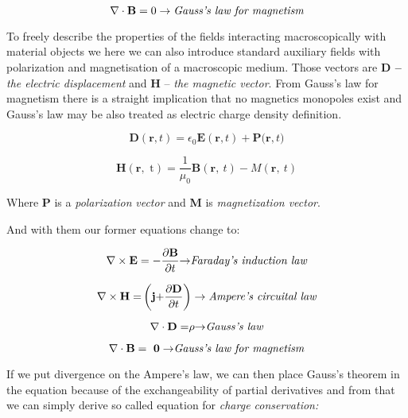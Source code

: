 \begin{equation}
\nabla \cdot \mathbf{B} =  0 \rightarrow \emph{Gauss's law for
magnetism}
\end{equation}

To freely describe the properties of the fields interacting
macroscopically with material objects we here we can also introduce
standard auxiliary fields with polarization and magnetisation of a
macroscopic medium. Those vectors are \textbf{D --} \emph{the electric
displacement} and \textbf{H} -- \emph{the magnetic vector}. From Gauss's
law for magnetism there is a straight implication that no magnetics
monopoles exist and Gauss's law may be also treated as electric charge
density definition.

\begin{equation}
\mathbf{D}\left( \mathbf{r,}t \right) = \epsilon_{0}\mathbf{E}\left( \mathbf{r,}t \right) + \mathbf{P(r,}t)
\end{equation}

\begin{equation}
\mathbf{H}\left( \mathbf{r,}\text{\ t} \right) = \frac{1}{\mu_{0}}\mathbf{B}\left( \mathbf{r,\ }t \right) - M(\mathbf{r,\ }t)
\end{equation}

Where \textbf{P} is a \emph{polarization} \emph{vector} and \textbf{M}
is \emph{magnetization vector}.

And with them our former equations change to:

\begin{equation}
\nabla \times \mathbf{E} = -\frac{\partial\mathbf{B}}{\partial t}\mathbf{\rightarrow}
\emph{Faraday's induction law}
\end{equation}

\begin{equation}
\nabla \times \mathbf{H =}\left( \mathbf{j +}\frac{\partial\mathbf{D}}{\partial t} \right) \rightarrow
\emph{Ampere's circuital law}
\end{equation}

\begin{equation}
\nabla \cdot \mathbf{D =}\rho\mathbf{\rightarrow} \emph{Gauss's
law}
\end{equation}

\begin{equation}
\nabla \cdot \mathbf{B = \ 0 \rightarrow} \emph{Gauss's law for
magnetism}
\end{equation}

If we put divergence on the Ampere's law, we can then place Gauss's
theorem in the equation because of the exchangeability of partial
derivatives and from that we can simply derive so called equation for
\emph{charge conservation:}

